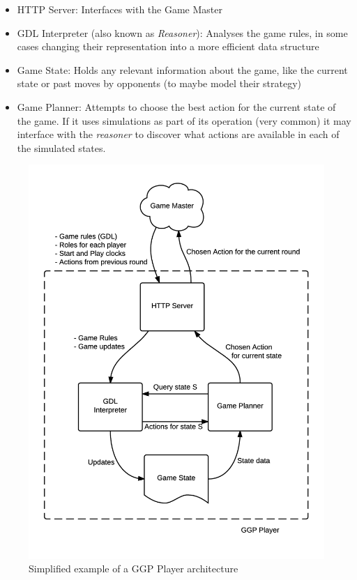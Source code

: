 \begin{itemize}
\item HTTP Server: Interfaces with the Game Master

\item \gls{GDL} Interpreter (also known as \textit{Reasoner}): Analyses the game rules, in some cases changing their representation into a more efficient data structure

\item Game State: Holds any relevant information about the game, like the current state or past moves by opponents (to maybe model their strategy)

\item Game Planner: Attempts to choose the best action for the current state of the game. If it uses simulations as part of its operation (very common) it may interface with the \textit{reasoner} to discover what actions are available in each of the simulated states.
\end{itemize}

\begin{figure}[h]
	\centering
    \includegraphics[scale=0.8]{images/GGPplayer.png}
    \caption{Simplified example of a GGP Player architecture}
    \label{fig:player architecture}
\end{figure}

